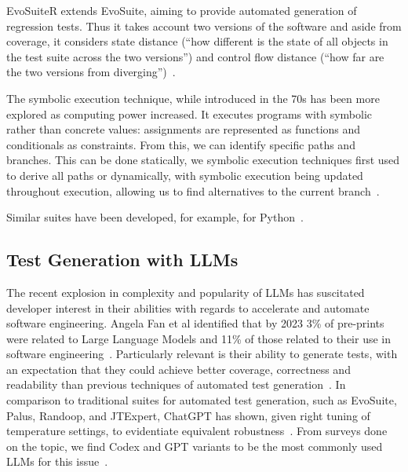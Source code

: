 EvoSuiteR extends EvoSuite, aiming to provide automated generation of regression tests. Thus it takes account two versions of the software and aside from coverage, it considers state distance (``how different is the state of
all objects in the test suite across the two versions'') and control flow distance (``how
far are the two versions from diverging'')~\cite{kn:evosuiter}.

The symbolic execution technique, while introduced in the 70s has been more explored as computing power increased. It executes programs with symbolic rather than concrete values: assignments are represented as functions and conditionals as constraints. From this, we can identify specific paths and branches. This can be done statically, we symbolic execution techniques first used to derive all paths or dynamically, with symbolic execution being updated throughout execution, allowing us to find alternatives to the current branch~\cite{kn:symbolicexec}.


Similar suites have been developed, for example, for Python~\cite{kn:pynguin}.

\subsection{Test Generation with LLMs}

The recent explosion in complexity and popularity of LLMs has suscitated developer interest in their abilities with regards to accelerate and automate software engineering. Angela Fan et al identified that by 2023 3\% of pre-prints were related to Large Language Models and 11\% of those related to their use in software engineering~\cite{kn:angela}. Particularly relevant is their ability to generate tests, with an expectation that they could achieve better coverage, correctness and readability than previous techniques of automated test generation~\cite{kn:junjiewang}.
In comparison to traditional suites for automated test generation, such as EvoSuite, Palus, Randoop, and JTExpert, ChatGPT has shown, given right tuning of temperature settings, to evidentiate equivalent robustness~\cite{kn:gptunitbra}.
From surveys done on the topic, we find Codex and GPT variants to be the most commonly used LLMs for this issue~\cite{kn:junjiewang}.


